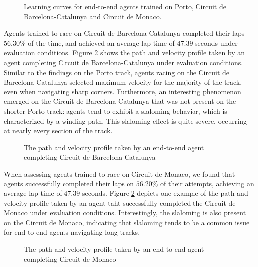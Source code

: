 \begin{figure}[htb!]
    \centering
    
    \caption[Learning curves for end-to-end agents trained and tested on Porto, Circuit de Barcelona-Catalunya and Circuit de Monaco]{Learning curves for end-to-end agents trained on Porto, Circuit de Barcelona-Catalunya and Circuit de Monaco.}
    \label{fig:ete_reward}
\end{figure}


Agents trained to race on Circuit de Barcelona-Catalunya completed their laps $56.30\%$ of the time, and achieved an average lap time of $47.39$ seconds under evaluation conditions.
Figure \ref{fig:ete_esp} shows the path and velocity profile taken by an agent completing Circuit de Barcelona-Catalunya under evaluation conditions.
Similar to the findings on the Porto track, agents racing on the Circuit de Barcelona-Catalunya selected maximum velocity for the majority of the track, even when navigating sharp corners. 
Furthermore, an interesting phenomenon emerged on the Circuit de Barcelona-Catalunya that was not present on the shorter Porto track: agents tend to exhibit a slaloming behavior, which is characterized by a winding path. 
This slaloming effect is quite severe, occurring at nearly every section of the track.


\begin{figure}[htb!]
    \centering
    
    \caption[The path and velocity profile taken by an end-to-end agent completing Circuit de Barcelona-Catalunya]{The path and velocity profile taken by an end-to-end agent completing Circuit de Barcelona-Catalunya}
    \label{fig:ete_esp}
\end{figure}

When assessing agents trained to race on Circuit de Monaco, we found that agents successfully completed their laps on $56.20\%$ of their attempts, achieving an average lap time of $47.39$ seconds. 
Figure \ref{fig:ete_esp} depicts one example of the path and velocity profile taken by an agent taht successfully completed the Circuit de Monaco under evaluation conditions. 
Interestingly, the slaloming is also present on the Circuit de Monaco, indicating that slaloming tends to be a common issue for end-to-end agents navigating long tracks.

\begin{figure}[htb!]
    \centering
    
    \caption[The path and velocity profile taken by an end-to-end agent completing Circuit de Monaco]{The path and velocity profile taken by an end-to-end agent completing Circuit de Monaco}
    \label{fig:ete_mco}
\end{figure}





